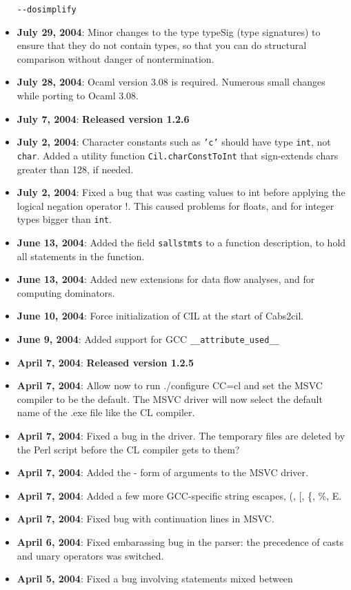 \documentclass{article}
\def\t#1{{\tt #1}}
\begin{document}
\begin{itemize}
  \t{-{}-dosimplify}
\item {\bf July 29, 2004}: Minor changes to the type typeSig (type signatures)
  to ensure that they do not contain types, so that you can do structural
  comparison without danger of nontermination. 
\item {\bf July 28, 2004}: Ocaml version 3.08 is required. Numerous small 
  changes while porting to Ocaml 3.08. 
\item {\bf July 7, 2004}: {\bf Released version 1.2.6}
\item {\bf July 2, 2004}:  Character constants such as \t{'c'} should
  have type \t{int}, not \t{char}.  Added a utility function
  \t{Cil.charConstToInt} that sign-extends chars greater than 128, if needed.
\item {\bf July 2, 2004}: Fixed a bug that was casting values to int
  before applying the logical negation operator !.  This caused
  problems for floats, and for integer types bigger than \t{int}.
\item {\bf June 13, 2004}: Added the field \t{sallstmts} to a function
  description, to hold all statements in the function.
\item {\bf June 13, 2004}: Added new extensions for data flow analyses, and
  for computing dominators.
\item {\bf June 10, 2004}: Force initialization of CIL at the start of
Cabs2cil. 
\item {\bf June 9, 2004}: Added support for GCC \t{\_\_attribute\_used\_\_}
\item {\bf April 7, 2004}: {\bf Released version 1.2.5}
\item {\bf April 7, 2004}: Allow now to run ./configure CC=cl and set the MSVC
compiler to be the default. The MSVC driver will now select the default name
of the .exe file like the CL compiler. 
\item {\bf April 7, 2004}: Fixed a bug in the driver. The temporary files are
deleted by the Perl script before the CL compiler gets to them?
\item {\bf April 7, 2004}: Added the - form of arguments to the MSVC driver.
\item {\bf April 7, 2004}: Added a few more GCC-specific string escapes, (, [,
\{, \%, E. 
\item {\bf April 7, 2004}: Fixed bug with continuation lines in MSVC.
\item {\bf April 6, 2004}: Fixed embarassing bug in the parser: the precedence
  of casts and unary operators was switched. 
\item {\bf April 5, 2004}: Fixed a bug involving statements mixed between

\end{itemize}
\end{document}
